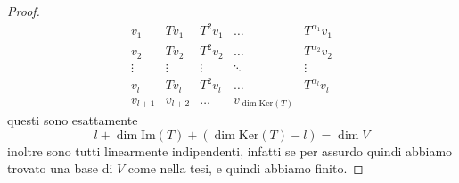 \documentclass[11pt]{scrartcl}
\newcommand{\Immagine}[1]{\text{Im}\left(#1\right)}
\renewcommand{\ker}[1]{\text{Ker}\left(#1\right)}
\begin{document}
\begin{proof}
   	 	$$
   	 	\begin{array}{ccccc}
   	 		v_1 &Tv_1 & T^2v_1 & \dots & T^{\alpha_1}v_1 \\
   	 		v_2 & Tv_2 & T^2v_2 & \dots & T^{\alpha_2}v_2 \\
   	 		\vdots & \vdots & \vdots & \ddots & \vdots \\
   	 		v_l & Tv_l & T^2v_l & \dots & T^{\alpha_l}v_l \\
   	 		v_{l+1} & v_{l+2} & \dots & v_{\dim\ker{T}}
   	 	\end{array}
   	 	$$
   	 	questi sono esattamente 
   	 	$$l+\dim\Immagine{T}+\left(\dim\ker{T}-l\right)=\dim V$$
   	 	inoltre sono tutti linearmente indipendenti, infatti se per assurdo  quindi abbiamo trovato una base di $V$ come nella tesi, e quindi abbiamo finito.
   	 \end{proof}
\end{document}
